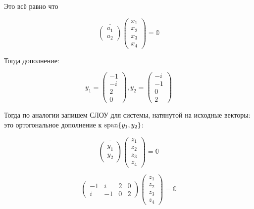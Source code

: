 \documentclass[12pt, a4paper]{article}
\begin{document}
    Это всё равно что

    \begin{equation}
        \overline{\begin{pmatrix}
            a_1 \\ a_2
        \end{pmatrix}} \begin{pmatrix}
            x_1 \\ x_2 \\ x_3 \\ x_4
        \end{pmatrix} = \mathbb{0}
    \end{equation}

    Тогда дополнение:

    \begin{equation}
        y_1 = \begin{pmatrix}
            -1 \\ -i \\ 2 \\ 0
        \end{pmatrix},
        y_2 = \begin{pmatrix}
            -i \\ -1\\ 0\\2
        \end{pmatrix}
    \end{equation}

    Тогда по аналогии запишем СЛОУ для системы, натянутой на исходные векторы: 
    это ортогональное дополнение к $\operatorname{span} \{ y_1, y_2 \}$:

    \begin{equation}
        \overline{\begin{pmatrix}
            y_1 \\ y_2
        \end{pmatrix}} \begin{pmatrix}
            z_1 \\ z_2 \\ z_3 \\ z_4
        \end{pmatrix} = \mathbb{0}
    \end{equation}

    \begin{equation}
        \begin{pmatrix}
            -1 & i & 2 & 0 \\ 
            i & -1& 0 & 2
        \end{pmatrix} \begin{pmatrix}
            z_1 \\ z_2 \\ z_3 \\ z_4
        \end{pmatrix} = \mathbb{0}
    \end{equation}
\end{document}
